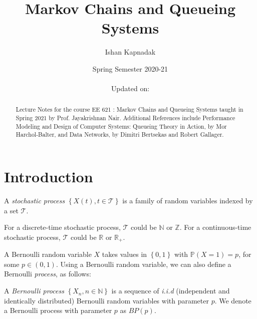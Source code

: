 \documentclass[12pt]{article}
\title{Markov Chains and Queueing Systems\\}
\author{Ishan Kapnadak}
\date{Spring Semester 2020-21\\~\\Updated on: \textcolor{blue}{\DTMToday}}
\def\P{\mathbb{P}}
\theoremstyle{definition}
\begin{document}
\maketitle

\begin{abstract}
    \begin{center}
        Lecture Notes for the course EE 621 : Markov Chains and Queueing Systems taught in Spring 2021 by Prof. Jayakrishnan Nair. Additional References include Performance Modeling and Design of Computer Systems: Queueing Theory in Action, by Mor Harchol-Balter, and Data Networks, by Dimitri Bertsekas and Robert Gallager.
    \end{center}
\end{abstract}

\tableofcontents
\newpage
\section{Introduction}

\begin{defn}
    A \emph{stochastic process} $\left\{ X(t), t \in \mathcal{T} \right\}$ is a family of random variables indexed by a set $\mathcal{T}$.
\end{defn}

For a discrete-time stochastic process, $\mathcal{T}$ could be $\mathbb{N}$ or $\mathbb{Z}$. For a continuous-time stochastic process, $\mathcal{T}$ could be $\mathbb{R}$ or $\mathbb{R}_+$. 

\medskip

A Bernoulli random variable $X$ takes values in $\left\{ 0,1 \right\}$ with $\P\left( X = 1 \right) = p$, for some $p \in (0,1)$. Using a Bernoulli random variable, we can also define a Bernoulli \emph{process}, as follows:

\begin{defn}
    A \emph{Bernoulli process} $\left\{ X_n, n \in \mathbb{N} \right\}$ is a sequence of \emph{i.i.d} (independent and identically distributed) Bernoulli random variables with parameter $p$. We denote a Bernoulli process with parameter $p$ as $BP(p)$.
\end{defn}
\end{document}

